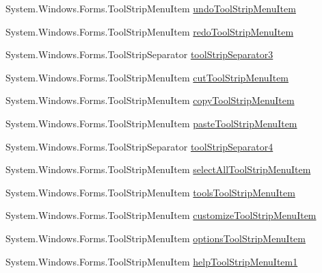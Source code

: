 \begin{DoxyCompactItemize}
\item 
\-System.\-Windows.\-Forms.\-Tool\-Strip\-Menu\-Item \hyperlink{class_sr_p___classroom_inq_1_1frm_classrrom_inq_a8163a2e440678bc9508520209879805e}{undo\-Tool\-Strip\-Menu\-Item}
\item 
\-System.\-Windows.\-Forms.\-Tool\-Strip\-Menu\-Item \hyperlink{class_sr_p___classroom_inq_1_1frm_classrrom_inq_a1b4d7ae0d344dc1fda1561a1d652fa6c}{redo\-Tool\-Strip\-Menu\-Item}
\item 
\-System.\-Windows.\-Forms.\-Tool\-Strip\-Separator \hyperlink{class_sr_p___classroom_inq_1_1frm_classrrom_inq_ac7f725652d980e8ef92f1119843f02a0}{tool\-Strip\-Separator3}
\item 
\-System.\-Windows.\-Forms.\-Tool\-Strip\-Menu\-Item \hyperlink{class_sr_p___classroom_inq_1_1frm_classrrom_inq_a62b714f774f74f0e4a36f60909cf7d78}{cut\-Tool\-Strip\-Menu\-Item}
\item 
\-System.\-Windows.\-Forms.\-Tool\-Strip\-Menu\-Item \hyperlink{class_sr_p___classroom_inq_1_1frm_classrrom_inq_a945826606f8dc78bfaaa45591619ecfc}{copy\-Tool\-Strip\-Menu\-Item}
\item 
\-System.\-Windows.\-Forms.\-Tool\-Strip\-Menu\-Item \hyperlink{class_sr_p___classroom_inq_1_1frm_classrrom_inq_a6cd3b1f68a59b97544531e749b77e868}{paste\-Tool\-Strip\-Menu\-Item}
\item 
\-System.\-Windows.\-Forms.\-Tool\-Strip\-Separator \hyperlink{class_sr_p___classroom_inq_1_1frm_classrrom_inq_a4b694b6ce3670642d724af5e79c46031}{tool\-Strip\-Separator4}
\item 
\-System.\-Windows.\-Forms.\-Tool\-Strip\-Menu\-Item \hyperlink{class_sr_p___classroom_inq_1_1frm_classrrom_inq_a7e6e1b306acf890605ad11f6aca7fce7}{select\-All\-Tool\-Strip\-Menu\-Item}
\item 
\-System.\-Windows.\-Forms.\-Tool\-Strip\-Menu\-Item \hyperlink{class_sr_p___classroom_inq_1_1frm_classrrom_inq_a89a0ae0ac6568cec51bb828874802c28}{tools\-Tool\-Strip\-Menu\-Item}
\item 
\-System.\-Windows.\-Forms.\-Tool\-Strip\-Menu\-Item \hyperlink{class_sr_p___classroom_inq_1_1frm_classrrom_inq_a3296cc0b41841b3014df5c5759d9e839}{customize\-Tool\-Strip\-Menu\-Item}
\item 
\-System.\-Windows.\-Forms.\-Tool\-Strip\-Menu\-Item \hyperlink{class_sr_p___classroom_inq_1_1frm_classrrom_inq_acdc1111ba8acc3bb1ee140845f069521}{options\-Tool\-Strip\-Menu\-Item}
\item 
\-System.\-Windows.\-Forms.\-Tool\-Strip\-Menu\-Item \hyperlink{class_sr_p___classroom_inq_1_1frm_classrrom_inq_a09bf82e0de8e7288e39988c7bfc5f5e7}{help\-Tool\-Strip\-Menu\-Item1}

\end{DoxyCompactItemize}
